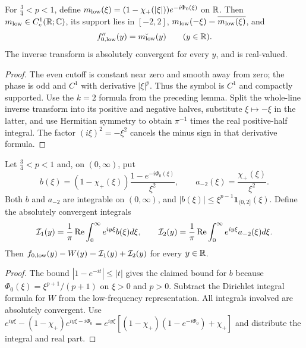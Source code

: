 \begin{lemma}
  \label{lem:c04_seed_low_fourier}
  For $\frac34<p<1$, define
  $m_{\textup{low}}(\xi)=(1-\chi_+(|\xi|))e^{-i\Phi_0(\xi)}$ on $\mathbb{R}$.
  Then $m_{\textup{low}}\in C^1_c(\mathbb{R};\mathbb{C})$, its support lies in $[-2,2]$,
  $m_{\textup{low}}(-\xi)=\overline{m_{\textup{low}}(\xi)}$, and
  \[
    f_{0,\textup{low}}''(y)=\check{m_{\textup{low}}}(y)\qquad(y\in\mathbb{R}).
  \]
  The inverse transform is absolutely convergent for every $y$, and is real-valued.
\end{lemma}
\begin{proof}
  The even cutoff is constant near zero and smooth away from zero; the phase is odd and
  $C^1$ with derivative $|\xi|^p$. Thus the symbol is $C^1$ and compactly supported.
  Use the $k=2$ formula from the preceding lemma. Split the whole-line inverse transform
  into its positive and negative halves, substitute $\xi\mapsto-\xi$ in the latter,
  and use Hermitian symmetry to obtain $\pi^{-1}$ times the real positive-half integral.
  The factor $(i\xi)^2=-\xi^2$ cancels the minus sign in that derivative formula.
\end{proof}

\begin{lemma}
  \label{lem:c04_seed_corner_decomposition}
  Let $\frac34<p<1$ and, on $(0,\infty)$, put
  \[
    b(\xi)=(1-\chi_+(\xi))\frac{1-e^{-i\Phi_0(\xi)}}{\xi^2},\qquad
    a_{-2}(\xi)=\frac{\chi_+(\xi)}{\xi^2}.
  \]
  Both $b$ and $a_{-2}$ are integrable on $(0,\infty)$, and
  $|b(\xi)|\le\xi^{p-1}\mathbf1_{(0,2]}(\xi)$.
  Define the absolutely convergent integrals
  \[
    \mathcal{I}_1(y)=\frac1\pi\operatorname{Re}\int_0^\infty e^{iy\xi}b(\xi)d\xi,
    \qquad
    \mathcal{I}_2(y)=\frac1\pi\operatorname{Re}\int_0^\infty e^{iy\xi}a_{-2}(\xi)d\xi.
  \]
  Then $f_{0,\textup{low}}(y)-W(y)=\mathcal{I}_1(y)+\mathcal{I}_2(y)$ for every $y\in\mathbb{R}$.
\end{lemma}
\begin{proof}
  The bound $|1-e^{-it}|\le|t|$ gives the claimed bound for $b$ because
  $\Phi_0(\xi)=\xi^{p+1}/(p+1)$ on $\xi>0$ and $p>0$.
  Subtract the Dirichlet integral formula for $W$ from the low-frequency representation.
  All integrals involved are absolutely convergent. Use
  $e^{iy\xi}-(1-\chi_+)e^{iy\xi-i\Phi_0}
    =e^{iy\xi}[(1-\chi_+)(1-e^{-i\Phi_0})+\chi_+]$
  and distribute the integral and real part.
\end{proof}

